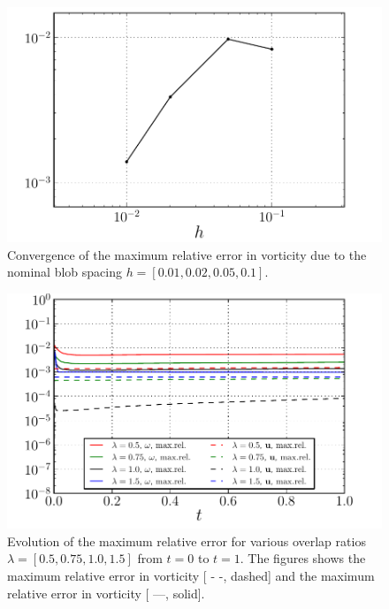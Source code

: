 	\begin{figure}[!p]
	\centering
	\includegraphics[width=0.6\linewidth]{./figures/validation/lambOseen/lambOseen_parameter_h_Trend.pdf}
	\caption{Convergence of the maximum relative error in vorticity due to the nominal blob spacing $h = [0.01,0.02,0.05,0.1]$.}
	\label{fig:lambOseen_parameter_h_Trend}
	\end{figure}
	
	\begin{figure}[!p]
	\centering
	\includegraphics[width=0.6\linewidth]{./figures/validation/lambOseen/lambOseen_parameter_overlap.pdf}
	\caption{Evolution of the maximum relative error for various overlap ratios $\lambda = [0.5, 0.75, 1.0, 1.5]$ from $t=0$ to $t=1$. The figures shows the maximum relative error in vorticity [ - -, dashed] and the maximum relative error in vorticity [ ---, solid].}
	\label{fig:lambOseen_parameter_overlap}
	\end{figure}		

